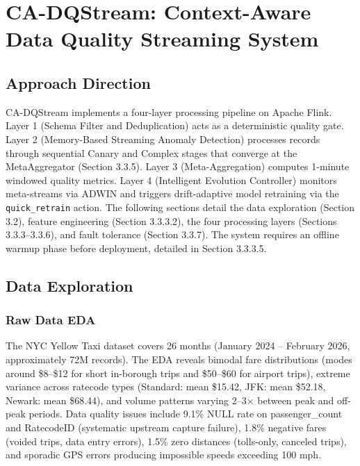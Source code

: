 ﻿\chapter{CA-DQStream: Context-Aware Data Quality Streaming System}
\pagestyle{fancy}


\section{Approach Direction}

CA-DQStream implements a four-layer processing pipeline on Apache Flink. Layer 1 (Schema Filter and Deduplication) acts as a deterministic quality gate. Layer 2 (Memory-Based Streaming Anomaly Detection) processes records through sequential Canary and Complex stages that converge at the MetaAggregator (Section 3.3.5). Layer 3 (Meta-Aggregation) computes 1-minute windowed quality metrics. Layer 4 (Intelligent Evolution Controller) monitors meta-streams via ADWIN and triggers drift-adaptive model retraining via the \texttt{quick\_retrain} action. The following sections detail the data exploration (Section 3.2), feature engineering (Section 3.3.3.2), the four processing layers (Sections 3.3.3--3.3.6), and fault tolerance (Section 3.3.7). The system requires an offline warmup phase before deployment, detailed in Section 3.3.3.5.

\section{Data Exploration}

\subsection{Raw Data EDA}

The NYC Yellow Taxi dataset covers 26 months (January 2024 -- February 2026, approximately 72M records). The EDA reveals bimodal fare distributions (modes around \$8--\$12 for short in-borough trips and \$50--\$60 for airport trips), extreme variance across ratecode types (Standard: mean \$15.42, JFK: mean \$52.18, Newark: mean \$68.44), and volume patterns varying 2--3$\times$ between peak and off-peak periods. Data quality issues include 9.1\% NULL rate on passenger\_count and RatecodeID (systematic upstream capture failure), 1.8\% negative fares (voided trips, data entry errors), 1.5\% zero distances (tolls-only, canceled trips), and sporadic GPS errors producing impossible speeds exceeding 100 mph.

